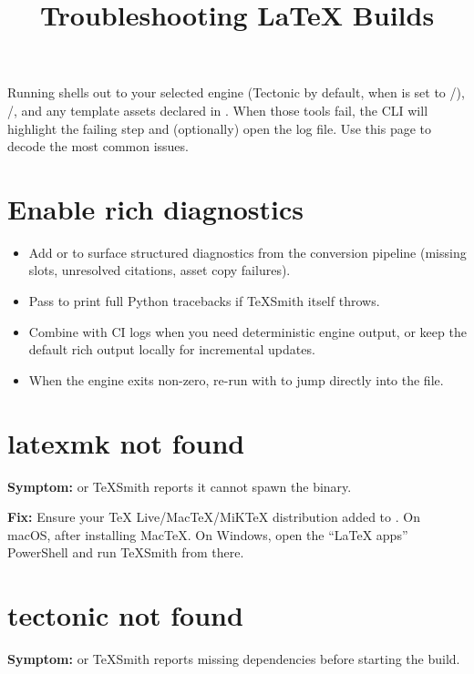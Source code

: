 \documentclass[a4paper,twoside]{article}
\title{Troubleshooting \LaTeX{} Builds}
\author{}\date{}
\begin{document}
\maketitle
Running  shells out to your selected engine (Tectonic by default,  when  is set to /), /, and any template assets declared in . When those tools fail, the CLI will highlight the failing step and (optionally) open the log file. Use this page to decode the most common issues.
\section{Enable rich diagnostics}
\begin{itemize}
\item Add  or  to surface structured diagnostics from the conversion pipeline (missing slots, unresolved citations, asset copy failures).
\item Pass  to print full Python tracebacks if TeXSmith itself throws.
\item Combine  with CI logs when you need deterministic engine output, or keep the default rich output locally for incremental updates.
\item When the engine exits non-zero, re-run with  to jump directly into the  file.
\end{itemize}
\section{latexmk not found}
\textbf{Symptom:}  or TeXSmith reports it cannot spawn the binary.

\textbf{Fix:} Ensure your \TeX{} Live/MacTeX/MiKTeX distribution added  to . On macOS,  after installing MacTeX. On Windows, open the ``\LaTeX{} apps'' PowerShell and run TeXSmith from there.
\section{tectonic not found}
\textbf{Symptom:}  or TeXSmith reports missing dependencies before starting the build.
\end{document}
